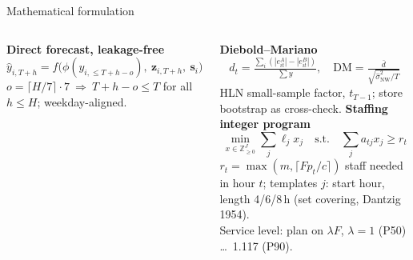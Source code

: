 \documentclass[aspectratio=169,11pt]{beamer}
\begin{document}
\begin{frame}{Mathematical formulation}
\begin{columns}[T]
\textbf{Direct forecast, leakage-free}
\[ \hat y_{i,T+h} = f\bigl(\phi(y_{i,\le T+h-o}),\ \mathbf z_{i,T+h},\ \mathbf s_i\bigr) \]
\small $o=\lceil H/7\rceil\cdot 7 \ \Rightarrow\ T+h-o\le T$ for all $h\le H$; weekday-aligned.
\vspace{6pt}

\normalsize\textbf{Diebold--Mariano}
\[ d_t=\tfrac{\sum_i(|e^A_{it}|-|e^B_{it}|)}{\sum y},\quad
   \mathrm{DM}=\tfrac{\bar d}{\sqrt{\hat\sigma^2_{\mathrm{NW}}/T}} \]
\small HLN small-sample factor, $t_{T-1}$; store bootstrap as cross-check.
\textbf{Staffing integer program}
\[ \min_{x\in\mathbb Z^J_{\ge0}} \sum_j \ell_j x_j \quad\text{s.t.}\quad \sum_j a_{tj}x_j \ge r_t \]
\small $r_t=\max(m,\lceil F p_t/c\rceil)$ staff needed in hour $t$; templates $j$: start hour,
length 4/6/8\,h (set covering, Dantzig 1954).\\[4pt]
Service level: plan on $\lambda F$, $\lambda=1$ (P50) \ldots\ 1.117 (P90).
\end{columns}
\end{frame}
\end{document}
